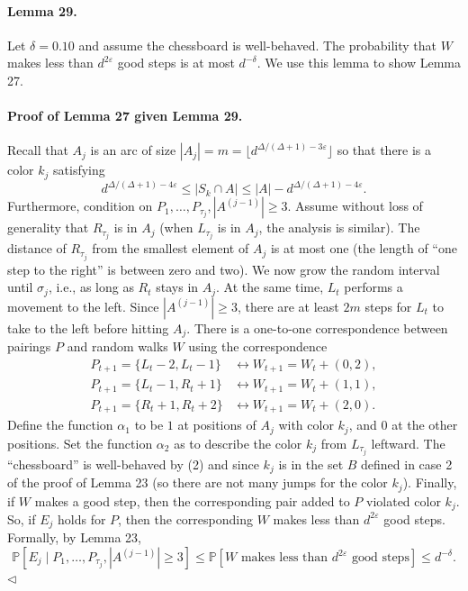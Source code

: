 \documentclass[10pt,a4paper]{article}
\begin{document}
\paragraph{Lemma 29.} Let $\delta=0.10$ and assume the chessboard is well-behaved. The probability that $W$ makes less than $d^{2\varepsilon}$ good steps is at most $d^{-\delta}$.
We use this lemma to show Lemma 27.
\paragraph{Proof of Lemma 27 given Lemma 29.} Recall that $A_j$ is an arc of size $|A_j|=m=\lfloor d^{\Delta/(\Delta+1)-3\varepsilon}\rfloor$ so that there is a color $k_j$ satisfying
\[d^{\Delta/(\Delta+1)-4\varepsilon}\leq|S_k\cap A|\leq|A|-d^{\Delta/(\Delta+1)-4\varepsilon}.\tag{2}\]
Furthermore, condition on $P_1,\ldots,P_{\tau_j},|A^{(j-1)}|\geq3$. Assume without loss of generality that $R_{\tau_j}$ is in $A_j$ (when $L_{\tau_j}$ is in $A_j$, the analysis is similar). The distance of $R_{\tau_j}$ from the smallest element of $A_j$ is at most one (the length of ``one step to the right'' is between zero and two). We now grow the random interval until $\sigma_j$, i.e., as long as $R_t$ stays in $A_j$. At the same time, $L_t$ performs a movement to the left. Since $|A^{(j-1)}|\geq3$, there are at least $2m$ steps for $L_t$ to take to the left before hitting $A_j$. There is a one-to-one correspondence between pairings $P$ and random walks $W$ using the correspondence
\begin{align*}
P_{t+1}=\{L_t-2,L_t-1\}&\longleftrightarrow W_{t+1}=W_t+(0,2),\\
P_{t+1}=\{L_t-1,R_t+1\}&\longleftrightarrow W_{t+1}=W_t+(1,1),\\
P_{t+1}=\{R_t+1,R_t+2\}&\longleftrightarrow W_{t+1}=W_t+(2,0).
\end{align*}
Define the function $\alpha_1$ to be $1$ at positions of $A_j$ with color $k_j$, and $0$ at the other positions. Set the function $\alpha_2$ as to describe the color $k_j$ from $L_{\tau_j}$ leftward. The ``chessboard'' is well-behaved by (2) and since $k_j$ is in the set $B$ defined in case 2 of the proof of Lemma 23 (so there are not many jumps for the color $k_j$). Finally, if $W$ makes a good step, then the corresponding pair added to $P$ violated color $k_j$. So, if $E_j$ holds for $P$, then the corresponding $W$ makes less than $d^{2\varepsilon}$ good steps. Formally, by Lemma 23,
\[\mathbb P[E_j\mid P_1,\ldots,P_{\tau_j},|A^{(j-1)}|\geq3]\leq\mathbb P[W\text{ makes less than }d^{2\varepsilon}\text{ good steps}]\leq d^{-\delta}.\]\hfill$\triangleleft$
\end{document}
